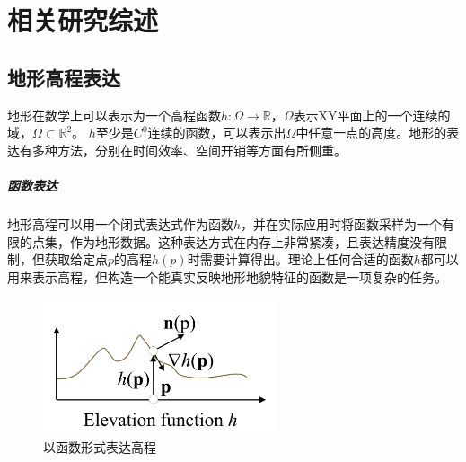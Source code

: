
\chapter{相关研究综述}
\section{地形高程表达}
地形在数学上可以表示为一个高程函数$h:\Omega\to\mathbb{R}$，$\Omega$表示XY平面上的一个连续的域，$\Omega \subset \mathbb{R}^2$。 $h$至少是$C^0$连续的函数，可以表示出$\Omega$中任意一点的高度。地形的表达有多种方法，分别在时间效率、空间开销等方面有所侧重。
\paragraph{函数表达}地形高程可以用一个闭式表达式作为函数$h$，并在实际应用时将函数采样为一个有限的点集，作为地形数据\supercite{CignoniRepresentation}。这种表达方式在内存上非常紧凑，且表达精度没有限制，但获取给定点$p$的高程$h(p)$时需要计算得出。理论上任何合适的函数$h$都可以用来表示高程，但构造一个能真实反映地形地貌特征的函数是一项复杂的任务。
\begin{figure}[htbp]
\centering
\includegraphics[height=4cm,width=6.9cm]{figures/continue.PNG}
\caption{以函数形式表达高程\supercite{eric-review}}
\end{figure}
